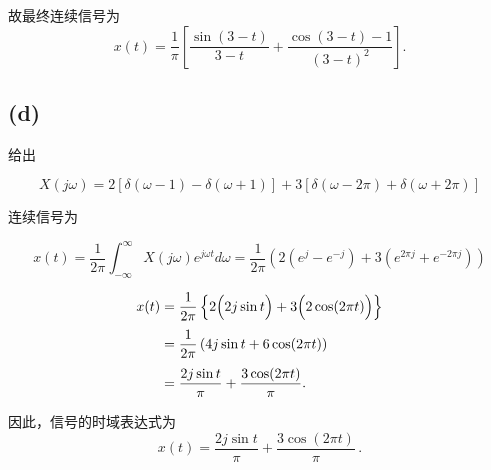 \documentclass[11pt]{article}
\begin{document}
故最终连续信号为 \[
\boxed{
x(t)=\frac{1}{\pi}\left[\frac{\sin(3-t)}{3-t}+\frac{\cos(3-t)-1}{(3-t)^2}\right].
}
\]

    \subsection{(d)}\label{d}

给出

\[
X(j\omega) = 2[\delta(\omega - 1) - \delta(\omega + 1)] + 3[\delta(\omega - 2\pi) + \delta(\omega + 2\pi)]
\]

连续信号为

\[
x(t) = \frac{1}{2\pi}\int_{-\infty}^\infty X(j\omega)e^{j\omega t}d\omega = \frac{1}{2\pi}\left(2(e^{j} - e^{-j}) + 3(e^{2\pi j} + e^{-2\pi j})\right)
\]

\[
\begin{aligned}
x(t)
&=\frac{1}{2\pi}\left\{2\Bigl(2j\sin t\Bigr) + 3\Bigl(2\cos(2\pi t)\Bigr)\right\}\\[1mm]
&=\frac{1}{2\pi}\left(4j\sin t + 6\cos(2\pi t)\right)\\[1mm]
&=\frac{2j\sin t}{\pi}+\frac{3\cos(2\pi t)}{\pi}.
\end{aligned}
\]

因此，信号的时域表达式为 \[
\boxed{ x(t)=\frac{2j\sin t}{\pi}+\frac{3\cos(2\pi t)}{\pi}\,. }
\]

    


    
    
    
\end{document}
